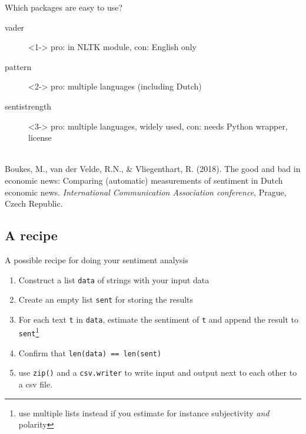 \documentclass{beamer}
\begin{document}
\begin{frame}{Which packages are easy to use?}
	
\begin{description}
	\item[vader]<1-> pro: in NLTK module, con: English only
	\item[pattern]<2-> pro: multiple languages (including Dutch)
	\item[sentistrength]<3-> pro: multiple languages, widely used, con: needs Python wrapper, license
	
\end{description}




\end{frame}


\begin{frame}%
\\
\tiny
Boukes, M., van der Velde, R.N., \& Vliegenthart, R. (2018). The good and bad in economic news: Comparing (automatic) measurements of sentiment in Dutch economic news. \emph{International Communication Association conference}, Prague, Czech Republic.
\end{frame}


\subsection{A recipe}

\begin{frame}{A possible recipe for doing your sentiment analysis}
	
\begin{enumerate}
	\item Construct a list \texttt{data} of strings with your input data
	\item Create an empty list \texttt{sent} for storing the results
	\item For each text \texttt{t} in \texttt{data}, estimate the sentiment of \texttt{t} and append the result to \texttt{sent}\footnote{use multiple lists instead if you estimate for instance subjectivity \emph{and} polarity}
	\item Confirm that \texttt{len(data) == len(sent)}
	\item use \texttt{zip()} and a  \texttt{csv.writer} to write input and output next to each other to a csv file.
\end{enumerate}

\end{frame}
\end{document}
